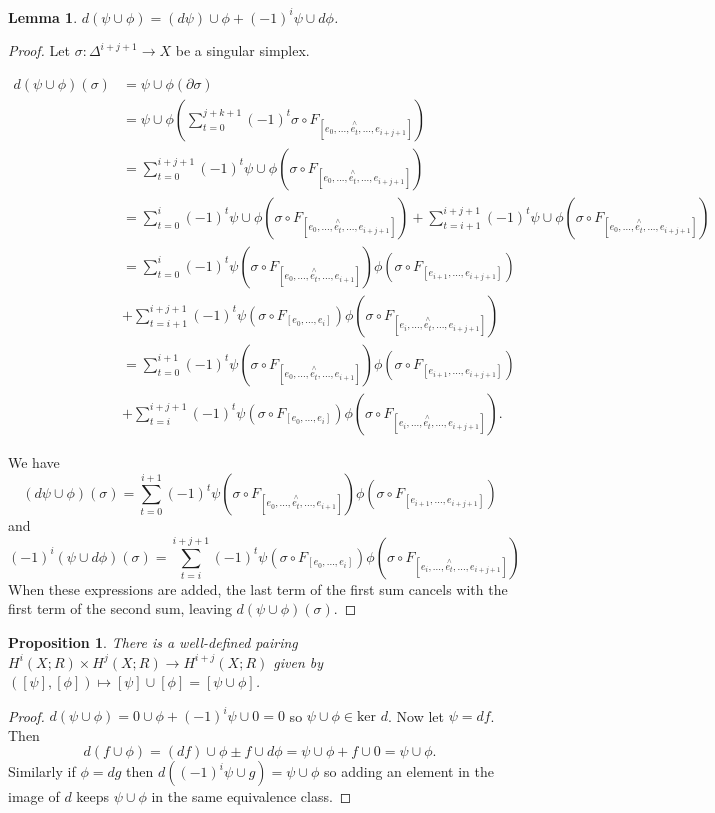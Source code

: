 \documentclass{article}
\newtheorem{lemma}[theorem]{Lemma}
\newtheorem{proposition}[theorem]{Proposition}
\begin{document}
\begin{lemma}
$d(\psi\cup\phi)=(d\psi)\cup\phi+(-1)^i\psi\cup d\phi$.
\end{lemma}
\begin{proof}
Let $\sigma\colon\Delta^{i+j+1}\to X$ be a singular simplex.

\begin{align*}
d(\psi\cup\phi)(\sigma)&=\psi\cup\phi(\partial\sigma)\\&=\psi\cup\phi(\sum_{t=0}^{j+k+1}(-1)^t\sigma\circ F_{[e_0,...,\overset{\wedge}{e_t},...,e_{i+j+1}]})\\&=\sum_{t=0}^{i+j+1}(-1)^t\psi\cup\phi(\sigma\circ F_{[e_0,...,\overset{\wedge}{e_t},...,e_{i+j+1}]})\\&=\sum_{t=0}^{i}(-1)^t\psi\cup\phi(\sigma\circ F_{[e_0,...,\overset{\wedge}{e_t},...,e_{i+j+1}]})+\sum_{t=i+1}^{i+j+1}(-1)^t\psi\cup\phi(\sigma\circ F_{[e_0,...,\overset{\wedge}{e_t},...,e_{i+j+1}]})\\&=\sum_{t=0}^i(-1)^t\psi(\sigma\circ F_{[e_0,...,\overset{\wedge}{e_t},...,e_{i+1}]})\phi(\sigma\circ F_{[e_{i+1},...,e_{i+j+1}]})\\&+\sum_{t=i+1}^{i+j+1}(-1)^t\psi(\sigma\circ F_{[e_0,...,e_{i}]})\phi(\sigma\circ F_{[e_{i},...,\overset{\wedge}{e_t},...,e_{i+j+1}]})\\
&=\sum_{t=0}^{i+1}(-1)^t\psi(\sigma\circ F_{[e_0,...,\overset{\wedge}{e_t},...,e_{i+1}]})\phi(\sigma\circ F_{[e_{i+1},...,e_{i+j+1}]})\\&+\sum_{t=i}^{i+j+1}(-1)^t\psi(\sigma\circ F_{[e_0,...,e_{i}]})\phi(\sigma\circ F_{[e_{i},...,\overset{\wedge}{e_t},...,e_{i+j+1}]}).
\end{align*}

\noindent We have \[(d\psi\cup\phi)(\sigma)=\sum_{t=0}^{i+1}(-1)^t\psi(\sigma\circ F_{[e_0,...,\overset{\wedge}{e_t},...,e_{i+1}]})\phi(\sigma\circ F_{[e_{i+1},...,e_{i+j+1}]})\]
and \[(-1)^i(\psi\cup d\phi)(\sigma)=\sum_{t=i}^{i+j+1}(-1)^t\psi(\sigma\circ F_{[e_0,...,e_i]})\phi(\sigma\circ F_{[e_i,...,\overset{\wedge}{e_t},...,e_{i+j+1}]})\] When these expressions are added, the last term of the first sum cancels with the first term of the second sum, leaving $d(\psi\cup\phi)(\sigma)$.
\end{proof}

\begin{proposition}
There is a well-defined pairing $H^i(X;R)\times H^j(X;R)\to H^{i+j}(X;R)$ given by $([\psi],[\phi])\mapsto [\psi]\cup [\phi]=[\psi\cup\phi]$.
\end{proposition}
\begin{proof}
$d(\psi\cup\phi)=0\cup\phi+(-1)^i\psi\cup 0=0$ so $\psi\cup\phi \in \text{ker }d$.
Now let $\psi=df$. Then \[d(f\cup\phi)=(df)\cup\phi\pm f\cup d\phi=\psi\cup\phi+f\cup0=\psi\cup\phi.\] Similarly if $\phi=dg$ then $d((-1)^i\psi\cup g)=\psi\cup\phi$ so adding an element in the image of $d$ keeps $\psi\cup\phi$ in the same equivalence class.
\end{proof}
\end{document}

